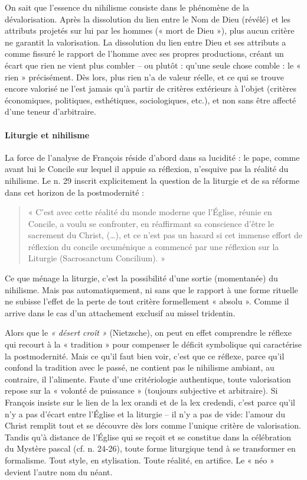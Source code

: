  
On sait que l’essence du nihilisme consiste dans le phénomène de la dévalorisation. Après la dissolution du lien entre le Nom de Dieu (révélé) et les attributs projetés sur lui par les hommes (« mort de Dieu »), plus aucun critère ne garantit la valorisation. La dissolution du lien entre Dieu et ses attributs a comme fissuré le rapport de l’homme avec ses propres productions, créant un écart que rien ne vient plus combler – ou plutôt : qu’une seule chose comble : le « rien » précisément. Dès lors, plus rien n’a de valeur réelle, et ce qui se trouve encore valorisé ne l’est jamais qu’à partir de critères extérieurs à l’objet (critères économiques, politiques, esthétiques, sociologiques, etc.), et non sans être affecté d’une teneur d’arbitraire.

\paragraph{Liturgie et nihilisme}
La force de l’analyse de François réside d’abord dans sa lucidité : le pape, comme avant lui le Concile sur lequel il appuie sa réflexion, n’esquive pas la réalité du nihilisme. Le n. 29 inscrit explicitement la question de la liturgie et de sa réforme dans cet horizon de la postmodernité : 
\begin{quote}
    « C’est avec cette réalité du monde moderne que l’Église, réunie en Concile, a voulu se confronter, en réaffirmant sa conscience d’être le sacrement du Christ, (…), et ce n’est pas un hasard si cet immense effort de réflexion du concile œcuménique a commencé par une réflexion sur la Liturgie (Sacrosanctum Concilium). »
\end{quote} 

Ce que ménage la liturgie, c’est la possibilité d’une sortie (momentanée) du nihilisme. Mais pas automatiquement, ni sans que le rapport à une forme rituelle ne subisse l’effet de la perte de tout critère formellement « absolu ». Comme il arrive dans le cas d’un attachement exclusif au missel tridentin.

 
Alors que le \textit{« désert croît »} (Nietzsche), on peut en effet comprendre le réflexe qui recourt à la « tradition » pour compenser le déficit symbolique qui caractérise la postmodernité. Mais ce qu’il faut bien voir, c’est que ce réflexe, parce qu’il confond la tradition avec le passé, ne contient pas le nihilisme ambiant, au contraire, il l’alimente. Faute d’une critériologie authentique, toute valorisation repose sur la « volonté de puissance » (toujours subjective et arbitraire). Si François insiste sur le lien de la lex orandi et de la lex credendi, c’est parce qu’il n’y a pas d’écart entre l’Église et la liturgie – il n’y a pas de vide: l’amour du Christ remplit tout et se découvre dès lors comme l’unique critère de valorisation. Tandis qu’à distance de l’Église qui se reçoit et se constitue dans la célébration du Mystère pascal (cf. n. 24-26), toute forme liturgique tend à se transformer en formalisme. Tout style, en stylisation. Toute réalité, en artifice. Le « néo » devient l’autre nom du néant.
